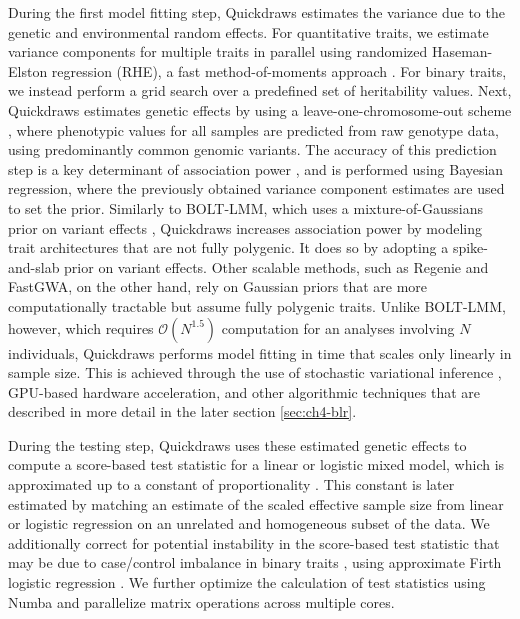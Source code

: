 During the first model fitting step, Quickdraws estimates the variance due to the genetic and environmental random effects.
%
For quantitative traits, we estimate variance components for multiple traits in parallel using randomized Haseman-Elston regression (RHE), a fast method-of-moments approach \cite{wu2018scalable,pazokitoroudi2020efficient,kalantzis2023thesis,zhu2024ARGRHE}.
%
For binary traits, we instead perform a grid search over a predefined set of heritability values.
%
Next, Quickdraws estimates genetic effects by using a leave-one-chromosome-out scheme \cite{lippert2011fast, listgarten2012improved, yang2014advantages, loh2015efficient}, where phenotypic values for all samples are predicted from raw genotype data, using predominantly common genomic variants.
%
The accuracy of this prediction step is a key determinant of association power \cite{yang2014advantages}, and is performed using Bayesian regression, where the previously obtained variance component estimates are used to set the prior.
%
Similarly to BOLT-LMM, which uses a mixture-of-Gaussians prior on variant effects \cite{loh2015efficient,loh2018mixed}, Quickdraws increases association power by modeling trait architectures that are not fully polygenic.
%
It does so by adopting a spike-and-slab prior on variant effects.
%
Other scalable methods, such as Regenie and FastGWA, on the other hand, rely on Gaussian priors that are more computationally tractable but assume fully polygenic traits.
%
Unlike BOLT-LMM, however, which requires $\mathcal{O}(N^{1.5})$ computation for an analyses involving $N$ individuals, Quickdraws performs model fitting in time that scales only linearly in sample size.
%
This is achieved through the use of stochastic variational inference \cite{hoffman2013stochastic}, GPU-based hardware acceleration, and other algorithmic techniques that are described in more detail in the later section \ref{sec:ch4-blr}.
%

%
During the testing step, Quickdraws uses these estimated genetic effects to compute a score-based test statistic for a linear or logistic mixed model, which is approximated up to a constant of proportionality \cite{svishcheva2012rapid, jakobsdottir2013mastor, loh2015efficient}.
%
This constant is later estimated by matching an estimate of the scaled effective sample size \cite{yang2011genomic} from linear or logistic regression on an unrelated and homogeneous subset of the data.
%
We additionally correct for potential instability in the score-based test statistic that may be due to case/control imbalance in binary traits \cite{zhou2018efficiently}, using approximate Firth logistic regression \cite{mbatchou2021computationally}.
%
We further optimize the calculation of test statistics using Numba \cite{lam2015numba} and parallelize matrix operations across multiple cores.

